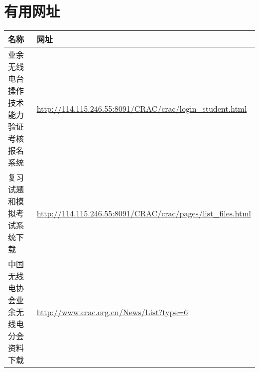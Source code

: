 

\newpage

\section{有用网址}

\begin{longtable}{|p{8cm}|p{8cm}|}
	\hline
	\textbf{名称} & \textbf{网址} \\
	\hline
	业余无线电台操作技术能力验证考核报名系统 & \url{http://114.115.246.55:8091/CRAC/crac/login_student.html} \\
	\hline
	复习试题和模拟考试系统下载 & \url{http://114.115.246.55:8091/CRAC/crac/pages/list_files.html} \\
	\hline
	中国无线电协会业余无线电分会资料下载 & \url{http://www.crac.org.cn/News/List?type=6} \\
	\hline
\end{longtable}
